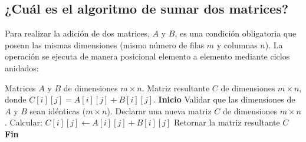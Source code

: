 \documentclass[12pt]{article}
\begin{document}
\subsection{¿Cuál es el algoritmo de sumar dos matrices?}
Para realizar la adición de dos matrices, $A$ y $B$, es una condición obligatoria que posean las mismas dimensiones (mismo número de filas $m$ y columnas $n$). La operación se ejecuta de manera posicional elemento a elemento mediante ciclos anidados:
\begin{algorithm}[H]
\caption{Suma de dos matrices}
\begin{algorithmic}[1]
    \REQUIRE Matrices $A$ y $B$ de dimensiones $m \times n$.
    \ENSURE Matriz resultante $C$ de dimensiones $m \times n$, donde $C[i][j] = A[i][j] + B[i][j]$.
    \STATE \textbf{Inicio}
    \STATE Validar que las dimensiones de $A$ y $B$ sean idénticas ($m \times n$).
    \STATE Declarar una nueva matriz $C$ de dimensiones $m \times n$.
            \STATE Calcular: $C[i][j] \leftarrow A[i][j] + B[i][j]$
        \ENDFOR
    \ENDFOR
    \STATE Retornar la matriz resultante $C$
    \STATE \textbf{Fin}
\end{algorithmic}
\end{algorithm}
\end{document}
